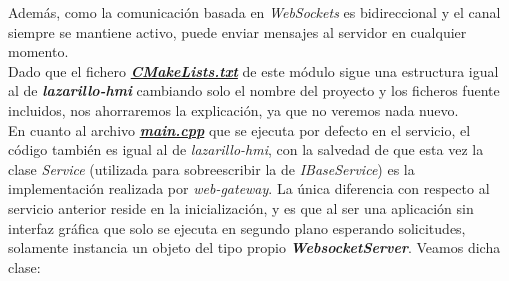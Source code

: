 Además, como la comunicación basada en \textit{WebSockets} es bidireccional y el canal siempre se mantiene activo, puede enviar mensajes al servidor en cualquier momento.\\

Dado que el fichero \textbf{\textit{\href{https://github.com/adrianmorente/lazarillo-embedded/blob/master/web-gateway/CMakeLists.txt}{CMakeLists.txt}}} de este módulo sigue una estructura igual al de \textbf{\textit{lazarillo-hmi}} cambiando solo el nombre del proyecto y los ficheros fuente incluidos, nos ahorraremos la explicación, ya que no veremos nada nuevo.\\

En cuanto al archivo \textbf{\textit{\href{https://github.com/adrianmorente/lazarillo-embedded/blob/master/web-gateway/src/main.cpp}{main.cpp}}} que se ejecuta por defecto en el servicio, el código también es igual al de \textit{lazarillo-hmi}, con la salvedad de que esta vez la clase \emph{Service} (utilizada para sobreescribir la de \emph{IBaseService}) es la implementación realizada por \textit{web-gateway}. La única diferencia con respecto al servicio anterior reside en la inicialización, y es que al ser una aplicación sin interfaz gráfica que solo se ejecuta en segundo plano esperando solicitudes, solamente instancia un objeto del tipo propio \textbf{\textit{WebsocketServer}}. Veamos dicha clase:\\

